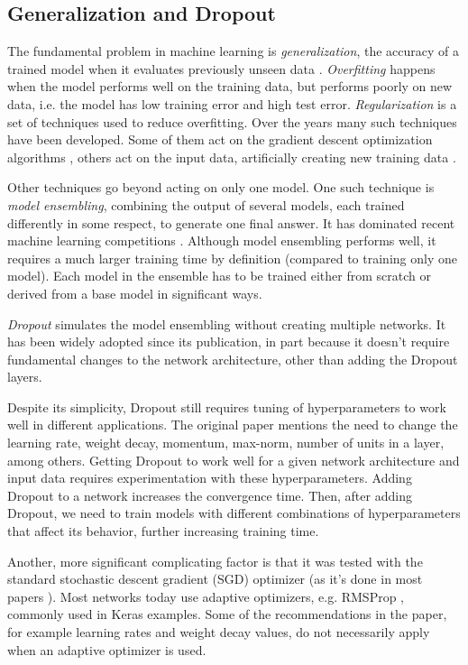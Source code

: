 \documentclass[../CAP6619_term_project_cgarbin.tex]{subfiles}
\begin{document}
\subsection{Generalization and Dropout}

The fundamental problem in machine learning is \textit{generalization}, the accuracy of a trained model when it evaluates previously unseen data \cite{Goodfellow2016}. \textit{Overfitting} happens when the model performs well on the training data, but performs poorly on new data, i.e. the model has low training error and high test error. \textit{Regularization} is a set of techniques used to reduce overfitting. Over the years many such techniques have been developed. Some of them act on the gradient descent optimization algorithms \cite{Ruder2016}, others act on the input data, artificially creating new training data \cite{Perez2017}.

Other techniques go beyond acting on only one model. One such technique is \textit{model ensembling}, combining the output of several models, each trained differently in some respect, to generate one final answer. It has dominated recent machine learning competitions \cite{Goodfellow2016}. Although model ensembling performs well, it requires a much larger training time by definition (compared to training only one model). Each model in the ensemble has to be trained either from scratch or derived from a base model in significant ways. 

\textit{Dropout} \cite{Srivastava2014} simulates the model ensembling without creating multiple networks. It has been widely adopted since its publication, in part because it doesn't require fundamental changes to the network architecture, other than adding the Dropout layers. 

Despite its simplicity, Dropout still requires tuning of hyperparameters to work well in different applications. The original paper \cite{Srivastava2014} mentions the need to change the learning rate, weight decay, momentum, max-norm, number of units in a layer, among others. Getting Dropout to work well for a given network architecture and input data requires experimentation with these hyperparameters. Adding Dropout to a network increases the convergence time\cite{Srivastava2014}. Then, after adding Dropout, we need to train models with different combinations of hyperparameters that affect its behavior, further increasing training time.

Another, more significant complicating factor is that it was tested with the standard stochastic descent gradient (SGD) optimizer (as it's done in most papers \cite{Ruder2016}). Most networks today use adaptive optimizers, e.g. RMSProp \cite{Tieleman2012}, commonly used in Keras examples. Some of the recommendations in the paper, for example learning rates and weight decay values, do not necessarily apply when an adaptive optimizer is used.
\end{document}
